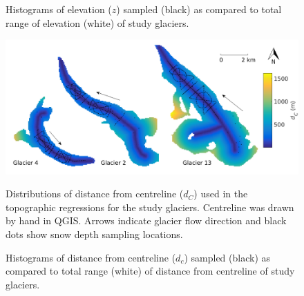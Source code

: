 \documentclass{sfuthesis}
\newcommand{\topomap}{Arrows indicate glacier flow direction and black dots show snow depth sampling locations. }
\begin{document}
\begin{figure}
	\caption{Histograms of elevation ($z$) sampled (black) as compared to total range of elevation (white) of study glaciers.}
	\label{sampledRange:elev}
\end{figure}

\begin{figure}
	\centering
	\includegraphics[width=\textwidth]{Map_centreD.png}\\
	\caption{Distributions of distance from centreline ($d_C$) used in the topographic regressions for the study glaciers. Centreline was drawn by hand in QGIS. \topomap}
	\label{map:centreD}
\end{figure}

\begin{figure}
	\caption{Histograms of distance from centreline ($d_c$) sampled (black) as compared to total range (white) of distance from centreline of study glaciers.}
	\label{sampledRange:centreD}
\end{figure}
\end{document}
